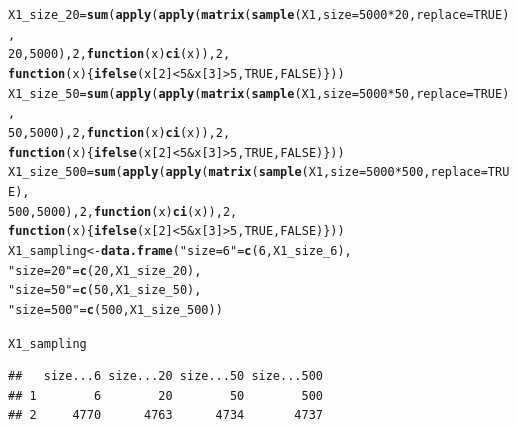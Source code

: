 \documentclass{article}\usepackage[]{graphicx}\usepackage[]{color}
\makeatletter
\newcommand{\hlnum}[1]{\textcolor[rgb]{0.686,0.059,0.569}{#1}}%
\newcommand{\hlstr}[1]{\textcolor[rgb]{0.192,0.494,0.8}{#1}}%
\newcommand{\hlopt}[1]{\textcolor[rgb]{0,0,0}{#1}}%
\newcommand{\hlstd}[1]{\textcolor[rgb]{0.345,0.345,0.345}{#1}}%
\newcommand{\hlkwa}[1]{\textcolor[rgb]{0.161,0.373,0.58}{\textbf{#1}}}%
\newcommand{\hlkwb}[1]{\textcolor[rgb]{0.69,0.353,0.396}{#1}}%
\newcommand{\hlkwc}[1]{\textcolor[rgb]{0.333,0.667,0.333}{#1}}%
\newcommand{\hlkwd}[1]{\textcolor[rgb]{0.737,0.353,0.396}{\textbf{#1}}}%
\newenvironment{kframe}{%
 \def\at@end@of@kframe{}%
 \ifinner\ifhmode%
  \def\at@end@of@kframe{\end{minipage}}%
  \begin{minipage}{\columnwidth}%
 \fi\fi%
 \def\FrameCommand##1{\hskip\@totalleftmargin \hskip-\fboxsep
 \colorbox{shadecolor}{##1}\hskip-\fboxsep
     \hskip-\linewidth \hskip-\@totalleftmargin \hskip\columnwidth}%
 \MakeFramed {\advance\hsize-\width
   \@totalleftmargin\z@ \linewidth\hsize
   \@setminipage}}%
 {\par\unskip\endMakeFramed%
 \at@end@of@kframe}
\newenvironment{knitrout}{}{} %
\makeatother
\begin{document}
\begin{knitrout}
\begin{kframe}
\begin{alltt}
\hlstd{X1_size_20} \hlkwb{=} \hlkwd{sum}\hlstd{(}\hlkwd{apply}\hlstd{(}\hlkwd{apply}\hlstd{(}\hlkwd{matrix}\hlstd{(}\hlkwd{sample}\hlstd{(X1,} \hlkwc{size} \hlstd{=} \hlnum{5000} \hlopt{*}\hlnum{20}\hlstd{,} \hlkwc{replace} \hlstd{=} \hlnum{TRUE}\hlstd{),}
                                   \hlnum{20}\hlstd{,}\hlnum{5000}\hlstd{),} \hlnum{2}\hlstd{,} \hlkwa{function}\hlstd{(}\hlkwc{x}\hlstd{)} \hlkwd{ci}\hlstd{(x)),} \hlnum{2}\hlstd{,}
                      \hlkwa{function}\hlstd{(}\hlkwc{x}\hlstd{)\{}\hlkwd{ifelse}\hlstd{(x[}\hlnum{2}\hlstd{]} \hlopt{<} \hlnum{5} \hlopt{&} \hlstd{x[}\hlnum{3}\hlstd{]} \hlopt{>} \hlnum{5}\hlstd{,} \hlnum{TRUE}\hlstd{,} \hlnum{FALSE}\hlstd{)\}))}
\hlstd{X1_size_50} \hlkwb{=} \hlkwd{sum}\hlstd{(}\hlkwd{apply}\hlstd{(}\hlkwd{apply}\hlstd{(}\hlkwd{matrix}\hlstd{(}\hlkwd{sample}\hlstd{(X1,} \hlkwc{size} \hlstd{=} \hlnum{5000} \hlopt{*}\hlnum{50}\hlstd{,} \hlkwc{replace} \hlstd{=} \hlnum{TRUE}\hlstd{),}
                                   \hlnum{50}\hlstd{,}\hlnum{5000}\hlstd{),} \hlnum{2}\hlstd{,} \hlkwa{function}\hlstd{(}\hlkwc{x}\hlstd{)} \hlkwd{ci}\hlstd{(x)),} \hlnum{2}\hlstd{,}
                      \hlkwa{function}\hlstd{(}\hlkwc{x}\hlstd{)\{}\hlkwd{ifelse}\hlstd{(x[}\hlnum{2}\hlstd{]} \hlopt{<} \hlnum{5} \hlopt{&} \hlstd{x[}\hlnum{3}\hlstd{]} \hlopt{>} \hlnum{5}\hlstd{,} \hlnum{TRUE}\hlstd{,} \hlnum{FALSE}\hlstd{)\}))}
\hlstd{X1_size_500} \hlkwb{=} \hlkwd{sum}\hlstd{(}\hlkwd{apply}\hlstd{(}\hlkwd{apply}\hlstd{(}\hlkwd{matrix}\hlstd{(}\hlkwd{sample}\hlstd{(X1,} \hlkwc{size} \hlstd{=} \hlnum{5000} \hlopt{*}\hlnum{500}\hlstd{,} \hlkwc{replace} \hlstd{=} \hlnum{TRUE}\hlstd{),}
                                   \hlnum{500}\hlstd{,}\hlnum{5000}\hlstd{),} \hlnum{2}\hlstd{,} \hlkwa{function}\hlstd{(}\hlkwc{x}\hlstd{)} \hlkwd{ci}\hlstd{(x)),} \hlnum{2}\hlstd{,}
                      \hlkwa{function}\hlstd{(}\hlkwc{x}\hlstd{)\{}\hlkwd{ifelse}\hlstd{(x[}\hlnum{2}\hlstd{]} \hlopt{<} \hlnum{5} \hlopt{&} \hlstd{x[}\hlnum{3}\hlstd{]} \hlopt{>} \hlnum{5}\hlstd{,} \hlnum{TRUE}\hlstd{,} \hlnum{FALSE}\hlstd{)\}))}
\hlstd{X1_sampling} \hlkwb{<-} \hlkwd{data.frame}\hlstd{(}\hlstr{"size = 6"} \hlstd{=} \hlkwd{c}\hlstd{(}\hlnum{6}\hlstd{, X1_size_6),}
                          \hlstr{"size = 20"} \hlstd{=} \hlkwd{c}\hlstd{(}\hlnum{20}\hlstd{, X1_size_20),}
                          \hlstr{"size = 50"} \hlstd{=} \hlkwd{c}\hlstd{(}\hlnum{50}\hlstd{, X1_size_50),}
                          \hlstr{"size = 500"} \hlstd{=} \hlkwd{c}\hlstd{(}\hlnum{500}\hlstd{, X1_size_500))}

\hlstd{X1_sampling}
\end{alltt}
\begin{verbatim}
##   size...6 size...20 size...50 size...500
## 1        6        20        50        500
## 2     4770      4763      4734       4737
\end{verbatim}
\end{kframe}
\end{knitrout}
\end{document}
